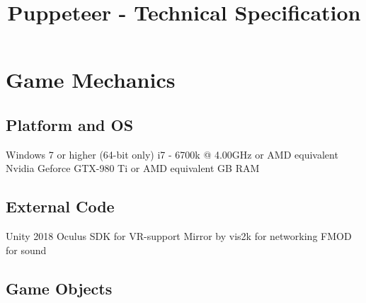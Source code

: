 \documentclass[11pt]{article}
\title{Puppeteer - Technical Specification}
\begin{document}
\maketitle


\newpage
\tableofcontents

\newpage
{}
\section{Game Mechanics}
\subsection{Platform and OS}
Windows 7 or higher (64-bit only)
\newline i7 - 6700k @ 4.00GHz or AMD equivalent
\newline Nvidia Geforce GTX-980 Ti or AMD equivalent
 GB RAM

\subsection{External Code}
Unity 2018
\newline Oculus SDK for VR-support
\newline Mirror by vis2k for networking
\newline FMOD for sound

\subsection{Game Objects}
\end{document}
